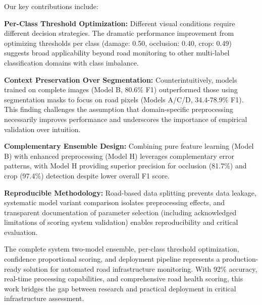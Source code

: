 \documentclass[12pt]{article}
\begin{document}
Our key contributions include:

\textbf{Per-Class Threshold Optimization:} Different visual conditions require different decision strategies. The dramatic performance improvement from optimizing thresholds per class (damage: 0.50, occlusion: 0.40, crop: 0.49) suggests broad applicability beyond road monitoring to other multi-label classification domains with class imbalance.

\textbf{Context Preservation Over Segmentation:} Counterintuitively, models trained on complete images (Model B, 80.6\% F1) outperformed those using segmentation masks to focus on road pixels (Models A/C/D, 34.4-78.9\% F1). This finding challenges the assumption that domain-specific preprocessing necessarily improves performance and underscores the importance of empirical validation over intuition.

\textbf{Complementary Ensemble Design:} Combining pure feature learning (Model B) with enhanced preprocessing (Model H) leverages complementary error patterns, with Model H providing superior precision for occlusion (81.7\%) and crop (97.4\%) detection despite lower overall F1 score.

\textbf{Reproducible Methodology:} Road-based data splitting prevents data leakage, systematic model variant comparison isolates preprocessing effects, and transparent documentation of parameter selection (including acknowledged limitations of scoring system validation) enables reproducibility and critical evaluation.

The complete system two-model ensemble, per-class threshold optimization, confidence proportional scoring, and deployment pipeline represents a production-ready solution for automated road infrastructure monitoring. With 92\% accuracy, real-time processing capabilities, and comprehensive road health scoring, this work bridges the gap between research and practical deployment in critical infrastructure assessment.



\end{document}
